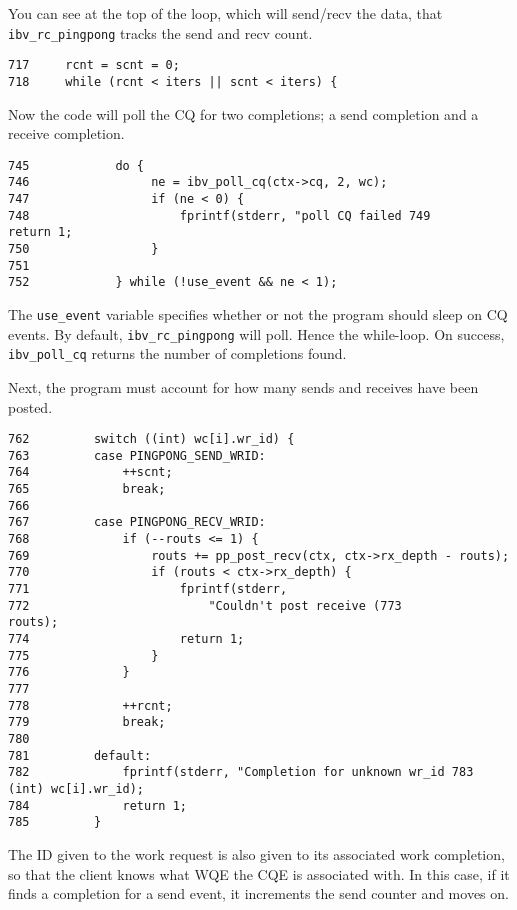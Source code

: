\documentclass[letterpaper,12pt]{article}
\begin{document}
You can see at the top of the loop, which will send/recv the data,
that {\tt ibv\_rc\_pingpong} tracks the send and recv count.

\lstset{language=C, caption=Flow Control}
\begin{lstlisting}
717     rcnt = scnt = 0;
718     while (rcnt < iters || scnt < iters) {
\end{lstlisting}

Now the code will poll the CQ for two completions; a send completion and a receive completion.

\lstset{language=C, caption=Polling the CQ}
\begin{lstlisting}
745            do {
746                 ne = ibv_poll_cq(ctx->cq, 2, wc);
747                 if (ne < 0) {
748                     fprintf(stderr, "poll CQ failed 749                     return 1;
750                 }
751
752            } while (!use_event && ne < 1);
\end{lstlisting}

The {\tt use\_event} variable specifies whether or not the program
should sleep on CQ events. By default, {\tt ibv\_rc\_pingpong} will
poll. Hence the while-loop. On success, {\tt ibv\_poll\_cq} returns the number
of completions found.

Next, the program must account for how many sends and receives have been posted.

\lstset{language=C, caption=Flow Control Accounting}
\begin{lstlisting}
762         switch ((int) wc[i].wr_id) {
763         case PINGPONG_SEND_WRID:
764             ++scnt;
765             break;
766
767         case PINGPONG_RECV_WRID:
768             if (--routs <= 1) {
769                 routs += pp_post_recv(ctx, ctx->rx_depth - routs);
770                 if (routs < ctx->rx_depth) {
771                     fprintf(stderr,
772                         "Couldn't post receive (773                         routs);
774                     return 1;
775                 }
776             }
777
778             ++rcnt;
779             break;
780
781         default:
782             fprintf(stderr, "Completion for unknown wr_id 783                     (int) wc[i].wr_id);
784             return 1;
785         }
\end{lstlisting}

The ID given to the work request is also given to its associated work
completion, so that the client knows what WQE the CQE is associated
with. In this case, if it finds a completion for a send event, it
increments the send counter and moves on.
\end{document}
